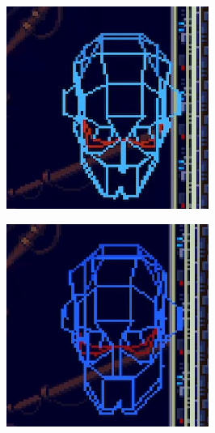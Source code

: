 \begin{figure}[htp]
	\centering
	\begin{subfigure}{0.3\linewidth}
		\centering
		\includegraphics[width=\linewidth]{figures/X2/Hunter_stages/Sigma_virus_phase_2.png}
	\end{subfigure}
	\begin{subfigure}{0.3\linewidth}
		\centering
		\includegraphics[width=\linewidth]{figures/X2/Hunter_stages/Sigma_virus_phase_3.png}

\end{subfigure}
\end{figure}
